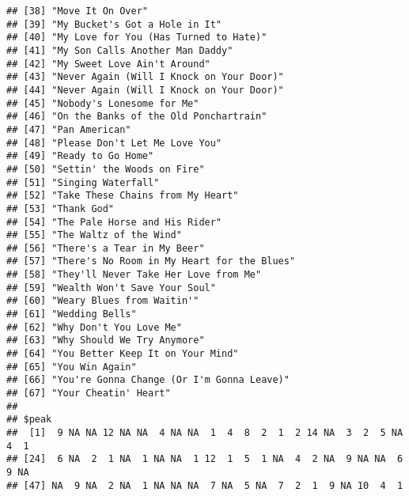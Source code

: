 \documentclass[]{article}
\newenvironment{Shaded}{\begin{snugshade}}{\end{snugshade}}
\newcommand{\KeywordTok}[1]{\textcolor[rgb]{0.13,0.29,0.53}{\textbf{#1}}}
\newcommand{\DecValTok}[1]{\textcolor[rgb]{0.00,0.00,0.81}{#1}}
\newcommand{\StringTok}[1]{\textcolor[rgb]{0.31,0.60,0.02}{#1}}
\newcommand{\CommentTok}[1]{\textcolor[rgb]{0.56,0.35,0.01}{\textit{#1}}}
\newcommand{\OperatorTok}[1]{\textcolor[rgb]{0.81,0.36,0.00}{\textbf{#1}}}
\newcommand{\NormalTok}[1]{#1}
\begin{document}
\begin{verbatim}
## [38] "Move It On Over"                                
## [39] "My Bucket's Got a Hole in It"                   
## [40] "My Love for You (Has Turned to Hate)"           
## [41] "My Son Calls Another Man Daddy"                 
## [42] "My Sweet Love Ain't Around"                     
## [43] "Never Again (Will I Knock on Your Door)"        
## [44] "Never Again (Will I Knock on Your Door)"        
## [45] "Nobody's Lonesome for Me"                       
## [46] "On the Banks of the Old Ponchartrain"           
## [47] "Pan American"                                   
## [48] "Please Don't Let Me Love You"                   
## [49] "Ready to Go Home"                               
## [50] "Settin' the Woods on Fire"                      
## [51] "Singing Waterfall"                              
## [52] "Take These Chains from My Heart"                
## [53] "Thank God"                                      
## [54] "The Pale Horse and His Rider"                   
## [55] "The Waltz of the Wind"                          
## [56] "There's a Tear in My Beer"                      
## [57] "There's No Room in My Heart for the Blues"      
## [58] "They'll Never Take Her Love from Me"            
## [59] "Wealth Won't Save Your Soul"                    
## [60] "Weary Blues from Waitin'"                       
## [61] "Wedding Bells"                                  
## [62] "Why Don't You Love Me"                          
## [63] "Why Should We Try Anymore"                      
## [64] "You Better Keep It on Your Mind"                
## [65] "You Win Again"                                  
## [66] "You're Gonna Change (Or I'm Gonna Leave)"       
## [67] "Your Cheatin' Heart"                            
## 
## $peak
##  [1]  9 NA NA 12 NA NA  4 NA NA  1  4  8  2  1  2 14 NA  3  2  5 NA  4  1
## [24]  6 NA  2  1 NA  1 NA NA  1 12  1  5  1 NA  4  2 NA  9 NA NA  6  9 NA
## [47] NA  9 NA  2 NA  1 NA NA NA  7 NA  5 NA  7  2  1  9 NA 10  4  1
\end{verbatim}

\begin{Shaded}
\end{Shaded}
\end{document}
